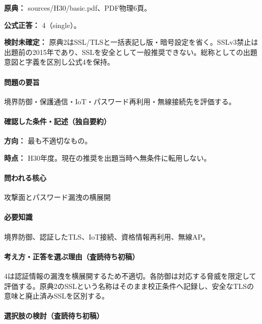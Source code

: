 \noindent\textbf{原典：} sources/H30/basic.pdf、PDF物理6頁。

\textbf{公式正答：} 4（single）。

\par\textbf{検討未確定：} 原典2はSSL/TLSと一括表記し版・暗号設定を省く。SSLv3禁止は出題前の2015年であり、SSLを安全として一般推奨できない。総称としての出題意図と字義を区別し公式4を保持。

\paragraph{問題の要旨} 境界防御・保護通信・IoT・パスワード再利用・無線接続先を評価する。

\paragraph{確認した条件・記述（独自要約）}\mbox{}\par

\noindent\textbf{方向：} 最も不適切なもの。\par

\noindent\textbf{時点：} H30年度。現在の推奨を出題当時へ無条件に転用しない。\par

\paragraph{問われる核心} 攻撃面とパスワード漏洩の横展開

\paragraph{必要知識} 境界防御、認証したTLS、IoT接続、資格情報再利用、無線AP。

\paragraph{考え方・正答を選ぶ理由（査読待ち初稿）} 4は認証情報の漏洩を横展開するため不適切。各防御は対応する脅威を限定して評価する。原典2のSSLという名称はそのまま校正条件へ記録し、安全なTLSの意味と廃止済みSSLを区別する。

\paragraph{選択肢の検討（査読待ち初稿）}\mbox{}\par

